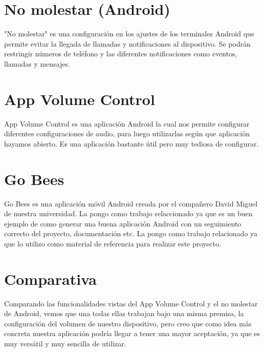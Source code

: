 
\section{No molestar (Android)}
"No molestar" es una configuración en los ajustes de los terminales Android que permite evitar la llegada de llamadas y notificaciones al dispositivo. Se podrán restringir números de teléfono y las diferentes notificaciones como eventos, llamadas y mensajes.

\section{App Volume Control}
App Volume Control es una aplicación Android la cual nos permite configurar diferentes configuraciones de audio, para luego utilizarlas según que aplicación hayamos abierto. Es una aplicación bastante útil pero muy tediosa de configurar.

\section{Go Bees}
Go Bees es una aplicación móvil Android creada por el compañero David Miguel de nuestra universidad.
La pongo como trabajo relaccionado ya que es un buen ejemplo de como generar una buena aplicación Android con un seguimiento correcto del proyecto, documentación etc. La pongo como trabajo relacionado ya que lo utilizo como material de referencia para realizar este proyecto.

\section{Comparativa}
Comparando las funcionalidades vistas del App Volume Control y el no molestar de Android, vemos que una todas ellas trabajan bajo una misma premisa, la configuración del volumen de nuestro dispositivo, pero creo que como idea más concreta nuestra aplicación podría llegar a tener una mayor aceptación, ya que es muy versátil y muy sencilla de utilizar.